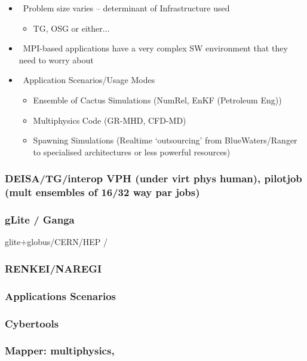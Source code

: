 \documentclass[12pt]{article}
\begin{document}
  \begin{itemize}  

   \item  Problem size varies – determinant of Infrastructure used
          \begin{itemize}
           \item TG, OSG or either...
          \end{itemize}
 
   \item  MPI-based applications have a very complex SW environment
          that they need to worry about
 
   \item  Application Scenarios/Usage Modes
          \begin{itemize}
           \item Ensemble of Cactus Simulations (NumRel, EnKF
                 (Petroleum Eng))
           \item Multiphysics Code (GR-MHD, CFD-MD)
           \item Spawning Simulations (Realtime ‘outsourcing’ from
                 BlueWaters/Ranger to specialised architectures or 
                 less powerful resources)
          \end{itemize}
 
  \end{itemize}

\subsubsection*{DEISA/TG/interop VPH (under virt phys human), pilotjob
                  (mult ensembles of 16/32 way par jobs)}
 \subsubsection*{gLite / Ganga} glite+globus/CERN/HEP /
 \subsubsection*{RENKEI/NAREGI}

\subsubsection{Applications Scenarios}
\subsubsection*{Cybertools} 
\subsubsection*{Mapper: multiphysics,}
\end{document}
